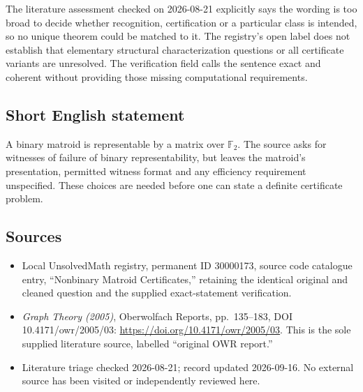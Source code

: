 \documentclass[11pt]{article}
\newcommand{\F}{\mathbb{F}}
\begin{document}
The literature assessment checked on 2026-08-21 explicitly says the wording is too broad to decide whether recognition, certification or a particular class is intended, so no unique theorem could be matched to it. The registry's open label does not establish that elementary structural characterization questions or all certificate variants are unresolved. The verification field calls the sentence exact and coherent without providing those missing computational requirements.
\subsection{Short English statement}
A binary matroid is representable by a matrix over \(\F_2\). The source asks for witnesses of failure of binary representability, but leaves the matroid's presentation, permitted witness format and any efficiency requirement unspecified. These choices are needed before one can state a definite certificate problem.
\subsection{Sources}
\begin{itemize}
\item Local UnsolvedMath registry, permanent ID 30000173, source code catalogue entry, ``Nonbinary Matroid Certificates,'' retaining the identical original and cleaned question and the supplied exact-statement verification.
\item \emph{Graph Theory (2005)}, Oberwolfach Reports, pp.\ 135--183, DOI 10.4171/owr/2005/03: \url{https://doi.org/10.4171/owr/2005/03}. This is the sole supplied literature source, labelled ``original OWR report.''
\item Literature triage checked 2026-08-21; record updated 2026-09-16. No external source has been visited or independently reviewed here.
\end{itemize}
\end{document}
